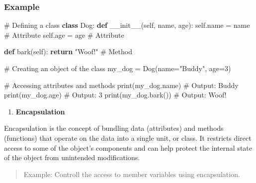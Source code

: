 \documentclass[
  letterpaper,
  DIV=11,
  numbers=noendperiod]{scrreprt}
\newenvironment{Shaded}{\begin{snugshade}}{\end{snugshade}}
\newcommand{\BuiltInTok}[1]{\textcolor[rgb]{0.00,0.23,0.31}{#1}}
\newcommand{\CommentTok}[1]{\textcolor[rgb]{0.37,0.37,0.37}{#1}}
\newcommand{\ControlFlowTok}[1]{\textcolor[rgb]{0.00,0.23,0.31}{\textbf{#1}}}
\newcommand{\DecValTok}[1]{\textcolor[rgb]{0.68,0.00,0.00}{#1}}
\newcommand{\FunctionTok}[1]{\textcolor[rgb]{0.28,0.35,0.67}{#1}}
\newcommand{\KeywordTok}[1]{\textcolor[rgb]{0.00,0.23,0.31}{\textbf{#1}}}
\newcommand{\NormalTok}[1]{\textcolor[rgb]{0.00,0.23,0.31}{#1}}
\newcommand{\OperatorTok}[1]{\textcolor[rgb]{0.37,0.37,0.37}{#1}}
\newcommand{\StringTok}[1]{\textcolor[rgb]{0.13,0.47,0.30}{#1}}
\newcommand{\VariableTok}[1]{\textcolor[rgb]{0.07,0.07,0.07}{#1}}
\providecommand{\tightlist}{%
  \setlength{\itemsep}{0pt}\setlength{\parskip}{0pt}}\usepackage{longtable,booktabs,array}
\theoremstyle{plain}
\theoremstyle{definition}
\theoremstyle{remark}
\begin{document}
\subsubsection{Example}\label{example}

\begin{Shaded}
\begin{Highlighting}[]
\CommentTok{\# Defining a class}
\KeywordTok{class}\NormalTok{ Dog:}
    \KeywordTok{def} \FunctionTok{\_\_init\_\_}\NormalTok{(}\VariableTok{self}\NormalTok{, name, age):}
        \VariableTok{self}\NormalTok{.name }\OperatorTok{=}\NormalTok{ name  }\CommentTok{\# Attribute}
        \VariableTok{self}\NormalTok{.age }\OperatorTok{=}\NormalTok{ age    }\CommentTok{\# Attribute}
    
    \KeywordTok{def}\NormalTok{ bark(}\VariableTok{self}\NormalTok{):}
        \ControlFlowTok{return} \StringTok{"Woof!"}   \CommentTok{\# Method}

\CommentTok{\# Creating an object of the class}
\NormalTok{my\_dog }\OperatorTok{=}\NormalTok{ Dog(name}\OperatorTok{=}\StringTok{"Buddy"}\NormalTok{, age}\OperatorTok{=}\DecValTok{3}\NormalTok{)}

\CommentTok{\# Accessing attributes and methods}
\BuiltInTok{print}\NormalTok{(my\_dog.name)  }\CommentTok{\# Output: Buddy}
\BuiltInTok{print}\NormalTok{(my\_dog.age)   }\CommentTok{\# Output: 3}
\BuiltInTok{print}\NormalTok{(my\_dog.bark())  }\CommentTok{\# Output: Woof!}
\end{Highlighting}
\end{Shaded}

\begin{enumerate}
\def\labelenumi{\arabic{enumi}.}
\setcounter{enumi}{1}
\tightlist
\item
  \textbf{Encapsulation}
\end{enumerate}

Encapsulation is the concept of bundling data (attributes) and methods
(functions) that operate on the data into a single unit, or class. It
restricts direct access to some of the object's components and can help
protect the internal state of the object from unintended modifications.

\begin{quote}
Example: Controll the access to member variables using encapsulation.
\end{quote}
\end{document}
